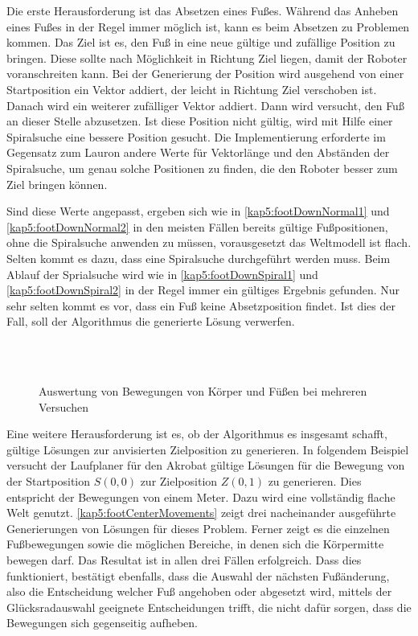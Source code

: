 Die erste Herausforderung ist das Absetzen eines Fußes. Während das Anheben eines Fußes in der Regel immer möglich ist, kann es beim Absetzen zu Problemen kommen. Das Ziel ist es, den Fuß in eine neue gültige und zufällige Position zu bringen. Diese sollte nach Möglichkeit in Richtung Ziel liegen, damit der Roboter voranschreiten kann. Bei der Generierung der Position wird ausgehend von einer Startposition ein Vektor addiert, der leicht in Richtung Ziel verschoben ist. Danach wird ein weiterer zufälliger Vektor addiert. Dann wird versucht, den Fuß an dieser Stelle abzusetzen. Ist diese Position nicht gültig, wird mit Hilfe einer Spiralsuche eine bessere Position gesucht. Die Implementierung erforderte im Gegensatz zum Lauron andere Werte für Vektorlänge und den Abständen der Spiralsuche, um genau solche Positionen zu finden, die den Roboter besser zum Ziel bringen können.

Sind diese Werte angepasst, ergeben sich wie in \autoref{kap5:footDownNormal1} und \autoref{kap5:footDownNormal2} in den meisten Fällen bereits gültige Fußpositionen, ohne die Spiralsuche anwenden zu müssen, vorausgesetzt das Weltmodell ist flach. Selten kommt es dazu, dass eine Spiralsuche durchgeführt werden muss. Beim Ablauf der Sprialsuche wird wie in \autoref{kap5:footDownSpiral1} und \autoref{kap5:footDownSpiral2} in der Regel immer ein gültiges Ergebnis gefunden. Nur sehr selten kommt es vor, dass ein Fuß keine Absetzposition findet. Ist dies der Fall, soll der Algorithmus die generierte Lösung verwerfen.

\begin{figure}[b!]
    \begin{center}
    \resizebox{0.75\linewidth}{!}{
      
    }
    \\[\smallskipamount]
    \resizebox{0.75\linewidth}{!}{
      
    }
    \\[\smallskipamount]
    \resizebox{0.75\linewidth}{!}{
      
    }
    \caption{Auswertung von Bewegungen von Körper und Füßen bei mehreren Versuchen}\label{kap5:footCenterMovements}
    \end{center}
\end{figure}

Eine weitere Herausforderung ist es, ob der Algorithmus es insgesamt schafft, gültige Lösungen zur anvisierten Zielposition zu generieren. In folgendem Beispiel versucht der Laufplaner für den Akrobat gültige Lösungen für die Bewegung von der Startposition $S(0,0)$ zur Zielposition $Z(0,1)$ zu generieren. Dies entspricht der Bewegungen von einem Meter. Dazu wird eine vollständig flache Welt genutzt. \autoref{kap5:footCenterMovements} zeigt drei nacheinander ausgeführte Generierungen von Lösungen für dieses Problem. Ferner zeigt es die einzelnen Fußbewegungen sowie die möglichen Bereiche, in denen sich die Körpermitte bewegen darf. Das Resultat ist in allen drei Fällen erfolgreich. Dass dies funktioniert, bestätigt ebenfalls, dass die Auswahl der nächsten Fußänderung, also die Entscheidung welcher Fuß angehoben oder abgesetzt wird, mittels der Glücksradauswahl geeignete Entscheidungen trifft, die nicht dafür sorgen, dass die Bewegungen sich gegenseitig aufheben.